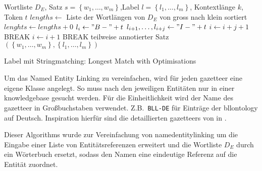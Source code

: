\begin{algorithm}
	\begin{tcolorbox}[talgostyle]
		\begin{algorithmic}
			\Require Wortliste $D_E$, Satz $s = \left\lbrace w_1, \hdots, w_m \right\rbrace$,Label  $l = \left\lbrace l_1, \hdots, l_m \right\rbrace$, Kontextlänge $k$, Token $t$
			\State $lengths \gets $ Liste der Wortlängen von $D_E$ von gross nach klein sortiert
			\State $lenghts \gets lengths + 0$
			\State $l_i \gets "B-"+t$
			\State $l_{i+1}, \hdots, l_{i+j}  \gets "I-"+t $
			\State $i \gets i+j+1$
			\State BREAK
			\EndIf
			\State $i \gets i + 1$
			\State BREAK
			\EndIf
			\EndIf
			\EndFor
			\EndWhile
			\Return teilweise annotierter Satz $\left(
				\left\lbrace
				w_1, \hdots, w_m
				\right\rbrace,
				\left\lbrace
				l_1, \hdots, l_m
				\right\rbrace
				\right)$
		\end{algorithmic}
	\end{tcolorbox}
	\caption{Label mit Stringmatching: Longest Match with Optimisations}\label{alg:stringmatching:optimized}
\end{algorithm}

Um das Named Entity Linking zu vereinfachen,
wird für jeden \gls{gazetteer}
eine eigene Klasse angelegt.
So muss nach den jeweiligen Entitäten nur in einer \gls{knowledgebase} gesucht werden.
Für die Einheitlichkeit wird der Name des \gls{gazetteer} in Großbuchstaben verwendet.
Z.B.\, \texttt{BLL-DE} für Einträge der \gls{bllontology} auf Deutsch.
Inspiration hierfür sind die detaillierten \glspl{gazetteer}
von \citeauthor{Leitner2019} in  \autocite{Leitner2019}.

Dieser Algorithms wurde zur Vereinfachung von \gls{namedentitylinking}
um die Eingabe einer Liste von Entitätsreferenzen erweitert
und die Wortliste $D_E$ durch ein Wörterbuch ersetzt,
sodass den Namen eine eindeutige Referenz auf die Entität zuordnet.